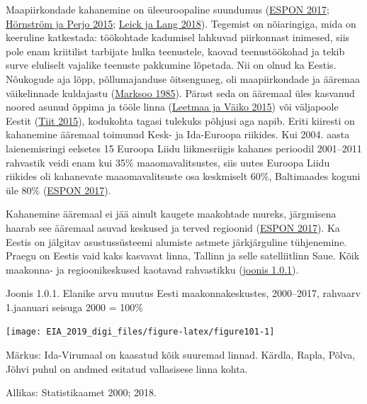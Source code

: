\documentclass[estonian,]{article}
\begin{document}
Maapiirkondade kahanemine on üleeuroopaline suundumus (\protect\hyperlink{ESPON2017}{ESPON 2017}; \protect\hyperlink{Huxf6rnstruxf6m2015}{Hörnström ja Perjo 2015}; \protect\hyperlink{Leick2018}{Leick ja Lang 2018}). Tegemist on nõiaringiga, mida on keeruline katkestada: töökohtade kadumisel lahkuvad piirkonnast inimesed, siis pole enam kriitilist tarbijate hulka teenustele, kaovad teenustöökohad ja tekib surve eluliselt vajalike teenuste pakkumine lõpetada. Nii on olnud ka Eestis. Nõukogude aja lõpp, põllumajanduse õitsenguaeg, oli maapiirkondade ja ääremaa väikelinnade kuldajastu (\protect\hyperlink{Marksoo1985}{Marksoo 1985}). Pärast seda on ääremaal üles kasvanud noored asunud õppima ja tööle linna (\protect\hyperlink{Leetmaa2015}{Leetmaa ja Väiko 2015}) või väljapoole Eestit (\protect\hyperlink{Tiit2015}{Tiit 2015}), kodukohta tagasi tulekuks põhjusi aga napib. Eriti kiiresti on kahanemine ääremaal toimunud Kesk- ja Ida-Euroopa riikides. Kui 2004. aasta laienemisringi eelsetes 15 Euroopa Liidu liikmesriigis kahanes perioodil 2001--2011 rahvastik veidi enam kui 35\% maaomavalitsustes, siis uutes Euroopa Liidu riikides oli kahanevate maaomavalitsuste osa keskmiselt 60\%, Baltimaades koguni üle 80\% (\protect\hyperlink{ESPON2017}{ESPON 2017}).

Kahanemine ääremaal ei jää ainult kaugete maakohtade mureks, järgmisena haarab see ääremaal asuvad keskused ja terved regioonid (\protect\hyperlink{ESPON2017}{ESPON 2017}). Ka Eestis on jälgitav asustussüsteemi alumiste astmete järkjärguline tühjenemine. Praegu on Eestis vaid kaks kasvavat linna, Tallinn ja selle satelliitlinn Saue. Kõik maakonna- ja regioonikeskused kaotavad rahvastikku (\protect\hyperlink{figure101}{joonis 1.0.1}).

{Joonis 1.0.1.} Elanike arvu muutus Eesti maakonnakeskustes, 2000--2017, rahvaarv 1.jaanuari seisuga 2000 = 100\%

\begin{center}\texttt{[image: EIA\_2019\_digi\_files/figure-latex/figure101-1]} \end{center}

\begin{figure-comment}
{Märkus:} Ida-Virumaal on kaasatud kõik suuremad linnad. Kärdla, Rapla,
Põlva, Jõhvi puhul on andmed esitatud vallasisese linna kohta.
\end{figure-comment}

\begin{imgsource}
{Allikas:} Statistikaamet 2000; 2018.
\end{imgsource}
\end{document}
